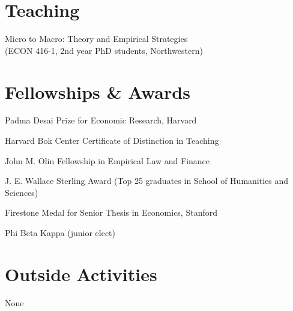 \documentclass[letterpaper]{article}
\begin{document}
\section*{Teaching}
\begin{description}[labelindent=0pt, labelwidth=0.7in, labelsep*=1em, leftmargin =!, font=\normalfont]
\item[2025] Micro to Macro: Theory and Empirical Strategies\\ (ECON 416-1, 2nd year PhD students, Northwestern) 
\end{description}

\section*{Fellowships \& Awards}
\begin{description}[labelindent=0pt, labelwidth=0.7in, labelsep*=1em, leftmargin =!, font=\normalfont]
\item[2024] Padma Desai Prize for Economic Research, Harvard 
\item[2021] Harvard Bok Center Certificate of Distinction in Teaching
\item[2021] John M. Olin Fellowship in Empirical Law and Finance
\item[2016] J. E. Wallace Sterling Award (Top 25 graduates in School of Humanities and Sciences)
\item[2016] Firestone Medal for Senior Thesis in Economics, Stanford
\item[2015] Phi Beta Kappa (junior elect)
\end{description}

\section*{Outside Activities}
None
\end{document}
